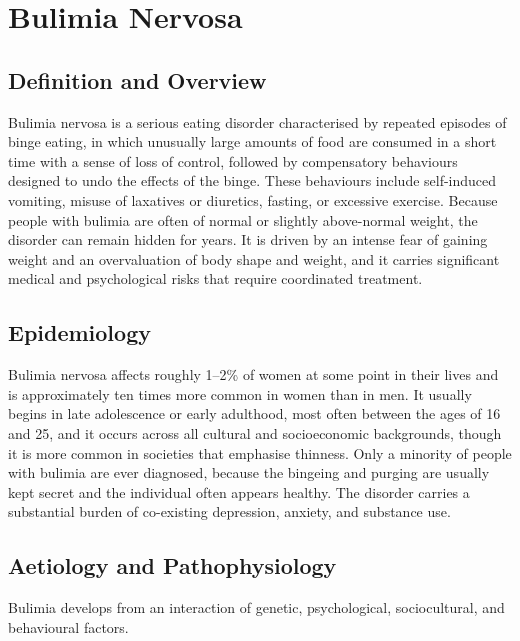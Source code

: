 \chapter{Bulimia Nervosa}

\section*{Definition and Overview}
Bulimia nervosa is a serious eating disorder characterised by repeated episodes of binge eating, in which unusually large amounts of food are consumed in a short time with a sense of loss of control, followed by compensatory behaviours designed to undo the effects of the binge. These behaviours include self-induced vomiting, misuse of laxatives or diuretics, fasting, or excessive exercise. Because people with bulimia are often of normal or slightly above-normal weight, the disorder can remain hidden for years. It is driven by an intense fear of gaining weight and an overvaluation of body shape and weight, and it carries significant medical and psychological risks that require coordinated treatment.

\section*{Epidemiology}
Bulimia nervosa affects roughly 1--2\% of women at some point in their lives and is approximately ten times more common in women than in men. It usually begins in late adolescence or early adulthood, most often between the ages of 16 and 25, and it occurs across all cultural and socioeconomic backgrounds, though it is more common in societies that emphasise thinness. Only a minority of people with bulimia are ever diagnosed, because the bingeing and purging are usually kept secret and the individual often appears healthy. The disorder carries a substantial burden of co-existing depression, anxiety, and substance use.

\section*{Aetiology and Pathophysiology}
Bulimia develops from an interaction of genetic, psychological, sociocultural, and behavioural factors.

